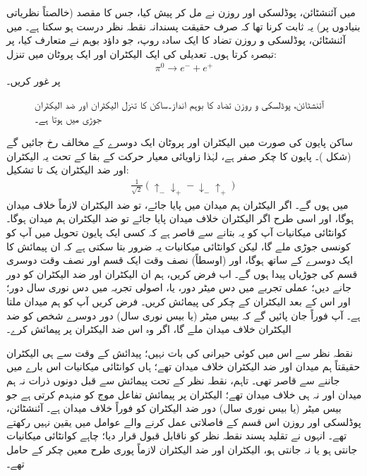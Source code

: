 میں آئنشٹائن، پوڈلسکی اور روزن نے مل کر  پیش کیا، جس کا مقصد (خالصتاً نظریاتی بنیادوں پر) یہ ثابت کرنا تھا کہ صرف حقیقت پسندانہ نقطہ نظر درست ہو سکتا ہے۔ میں آئنشٹائن، پوڈلسکی و روزن تضاد کا ایک سادہ روپ، جو داؤد بوہم نے متعارف کیا، پر تبصرہ کرتا ہوں۔ تعدیلی  کی ایک الیکٹران اور ایک پروٹان میں تنزل:
\begin{align*}
	\pi^0\to e^{-}+e^{+}
\end{align*}
 پر غور کریں۔
\begin{figure}
\centering
{}
\caption{آئنشٹائن، پوڈلسکی و روزن تضاد کا بوہم انداز۔ساکن  کا تنزل الیکٹران اور ضد الیکٹران جوڑی میں ہوتا ہے۔}
\label{شکل_بکھراو_بوہم_تنزل}
\end{figure}
%
ساکن پایون کی صورت میں الیکٹران اور پروٹان ایک دوسرے کے مخالف رخ جائیں گے (شکل )۔ پایون کا چکر صفر ہے، لہٰذا زاویائی معیار حرکت کے بقا کے تحت یہ الیکٹران اور ضد الیکٹران یک تا تشکیل:
\begin{align}\label{مساوات_پس_ہمبستہ}
	\frac{1}{\sqrt{2}}(\uparrow_{-}\downarrow_{+}-\downarrow_{-}\uparrow_{+})
\end{align}
 میں ہوں گے۔ اگر الیکٹران ہم میدان میں پایا جائے، تو ضد الیکٹران لازماً خلاف میدان ہوگا، اور اسی طرح اگر الیکٹران خلاف میدان پایا جائے تو ضد الیکٹران ہم میدان ہوگا۔ کوانٹائی میکانیات آپ کو یہ بتانے سے قاصر ہے کہ کسی ایک پایون تحویل میں آپ کو کونسی جوڑی ملے گا، لیکن کوانٹائی میکانیات یہ ضرور بتا سکتی ہے کہ ان پیمائش کا ایک دوسرے کے ساتھ  ہوگا، اور (اوسطاً) نصف وقت ایک قسم اور نصف وقت دوسری قسم کی جوڑیاں پیدا ہوں گے۔ اب فرض کریں، ہم ان الیکٹران اور ضد الیکٹران کو دور جانے دیں؛ عملی تجربے میں دس میٹر دور، یا، اصولی تجربہ میں دس نوری سال دور؛ اور اس کے بعد الیکٹران کے چکر کی پیمائش کریں۔ فرض کریں آپ کو ہم میدان ملتا ہے۔ آپ فوراً جان پائیں گے کہ بیس میٹر (یا بیس نوری سال) دور دوسرے شخص کو ضد الیکٹران خلاف میدان ملے گا، اگر وہ اس ضد الیکٹران پر پیمائش کرے۔
 
 نقطہ نظر سے اس میں کوئی حیرانی کی بات نہیں؛ پیدائش کے وقت سے ہی الیکٹران حقیقتاً ہم میدان اور ضد الیکٹران خلاف میدان تھے؛ ہاں کوانٹائی میکانیات اس بارے میں جاننے سے قاصر تھی۔ تاہم،  نقطہ نظر کے تحت پیمائش سے قبل دونوں ذرات نہ ہم میدان اور نہ ہی خلاف میدان تھے؛ الیکٹران پر پیمائش تفاعل موج کو منہدم کرتی ہے جو بیس میٹر (یا بیس نوری سال) دور ضد الیکٹران کو فوراً خلاف میدان  ہے۔ آئنشٹائن، پوڈلسکی اور روزن اس قسم کے فاصلاتی عمل کرنے والے عوامل میں یقین نہیں رکھتے تھے۔ انہوں نے تقلید پسند نقطہ نظر کو ناقابل قبول قرار دیا؛ چاہے کوانٹائی میکانیات جانتی ہو یا نہ جانتی ہو، الیکٹران اور ضد الیکٹران لازماً پوری طرح معین چکر کے حامل تھے۔ 

